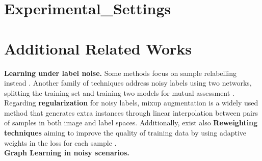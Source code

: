 \documentclass[twoside]{article}
\theoremstyle{definition}
\begin{document}
%

%

\onecolumn
{}



\section{ Experimental_Settings} 
 
\label{sec:experimental_setting}

\section{Additional Related Works}
\label{sec:additional_related_works}
\textbf{Learning under label noise.}
Some methods focus on sample relabelling instead \cite{reed2014training, arazo2019unsupervised, reed2014training}.
Another family of techniques address noisy labels using two networks, splitting the training set and training two models for mutual assessment \cite{jiang2018mentornet, han2018co, li2020dividemix, kim2023crosssplit}. 
Regarding \textbf{regularization} for noisy labels, mixup augmentation \cite{mixup} is a widely used method that generates extra instances through linear interpolation between pairs of samples in both image and label spaces. Additionally, exist also \textbf{Reweighting techniques} aiming to improve the quality of training data by using adaptive weights in the loss for each sample \cite{liu2015classification, zhang2020decoupling, han2018co,pleiss2020identifying}.\\
\textbf{Graph Learning in noisy scenarios.} 
\end{document}

